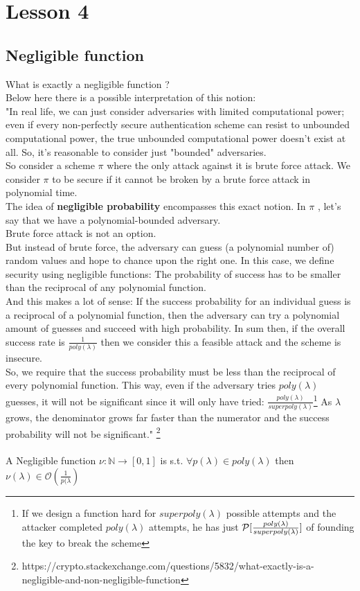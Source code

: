\chapter*{ Lesson 4}
\section{Negligible function}
What is exactly a negligible function ?\\
Below here there is a possible interpretation of this notion:\\
"In real life, we can just consider adversaries with limited computational power;
 even if every non-perfectly secure authentication scheme can resist to
 unbounded computational power, the true unbounded computational power doesn't
 exist at all. So, it's reasonable to consider just "bounded"
 adversaries.\\
So consider a scheme $\pi$  where the only attack against it is brute force
attack. We consider $\pi$ to be secure if it cannot be broken by a brute force
attack in polynomial time.\\
The idea of \textbf{negligible probability } encompasses this exact notion. In $\pi$
, let's say that we have a polynomial-bounded adversary. \\
Brute force attack is not an option.\\
But instead of brute force, the adversary can guess (a polynomial
number of) random values and hope to chance upon the right one. In this case, we
define security using negligible functions: The probability of success has to be
smaller than the reciprocal of any polynomial function.\\
And this makes a lot of sense: If the success probability for an individual
guess is a reciprocal of a polynomial function, then the adversary can try a
polynomial amount of guesses and succeed with high probability. In sum then, if
the overall success rate is $\frac{1}{poly(\lambda)}$ then we consider this a
feasible attack and the scheme is insecure.\\ So, we require that the success
probability must be less than the reciprocal of every polynomial function.  This
way, even if the adversary tries $poly(\lambda)$ guesses, it will not be
significant since it will only have tried:
$\frac{poly(\lambda)}{superpoly(\lambda)}$\footnote{If we design a function hard
for $superpoly(  \lambda)$ possible attempts and the attacker completed $poly(
    \lambda)$ attempts, he has just $ \P [ \frac{poly(\lambda)}{superpoly(\lambda)} ]   $
of founding the key to break the scheme}
As $\lambda$ grows, the denominator grows far faster than the numerator and the
success probability will not be significant."
\footnote{https://crypto.stackexchange.com/questions/5832/what-exactly-is-a-negligible-and-non-negligible-function}
\\~\\
A Negligible  function
$\nu: \mathbb{N} \rightarrow [0,1]$
  is s.t.
  $\forall p( \lambda ) \in poly( \lambda)$
 then 
 $\nu( \lambda) \in \mathcal{O}(\frac{1}{p( \lambda})$

